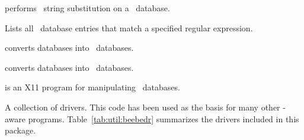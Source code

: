  performs \BibTeX\ string substitution on a 
\BibTeX\ database.


Lists all \BibTeX\ database entries that match a specified regular
expression.


 converts  databases into \BibTeX\
databases.


 converts  databases into \BibTeX\
databases.


 is an X11 program for manipulating \BibTeX\ databases.

\newpage
{}

A collection of  drivers.  This code has been used as the basis
for many other -aware programs.  Table~\ref{tab:util:beebedr}
summarizes the drivers included in this package.

